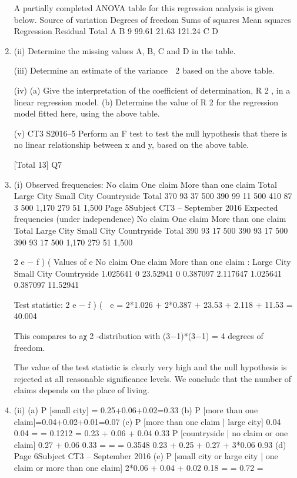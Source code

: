 \documentclass[a4paper,12pt]{article}
\begin{document}
\begin{enumerate}
A partially completed ANOVA table for this regression analysis is given below.
Source of
variation Degrees of
freedom Sums of
squares Mean
squares
Regression
Residual
Total A
B
9 99.61
21.63
121.24 C
D
\item (ii) Determine the missing values A, B, C and D in the table.

(iii) Determine an estimate of the variance  2 based on the above table.

(iv) (a) Give the interpretation of the coefficient of determination, R 2 , in a
linear regression model.
(b) Determine the value of R 2 for the regression model fitted here, using
the above table.

(v)
CT3 S2016–5
Perform an F test to test the null hypothesis that there is no linear relationship
between x and y, based on the above table.

[Total 13]
Q7
\item (i)
Observed frequencies:
No claim
One claim
More than one claim
Total
Large City Small City Countryside Total
370
93
37
500 390
99
11
500 410
87
3
500 1,170
279
51
1,500
Page 5Subject CT3  – September 2016 
Expected frequencies (under independence)
No claim
One claim
More than one claim
Total
Large City Small City Countryside Total
390
93
17
500 390
93
17
500 390
93
17
500 1,170
279
51
1,500

2
e − f )
(
Values of
e
No claim
One claim
More than one claim
:
Large City Small City Countryside
1.025641
0
23.52941 0
0.387097
2.117647 1.025641
0.387097
11.52941

Test statistic:
2
e − f )
(

e
= 2*1.026 + 2*0.387 + 23.53 + 2.118 + 11.53 = 40.004

This compares to aχ 2 -distribution with (3−1)*(3−1) = 4 degrees of freedom.

The value of the test statistic is clearly very high and the null hypothesis is
rejected at all reasonable significance levels. We conclude that the number of
claims depends on the place of living.

\item (ii)
(a) P [small city] = 0.25+0.06+0.02=0.33 
(b) P [more than one claim]=0.04+0.02+0.01=0.07 
(c) P [more than one claim | large city]
0.04
0.04
=
= 0.1212
=
0.23 + 0.06 + 0.04 0.33 
P [countryside | no claim or one claim]
0.27 + 0.06
0.33
=
=
= 0.3548
0.23 + 0.25 + 0.27 + 3*0.06 0.93 
(d)
Page 6Subject CT3  – September 2016 
(e)
P [small city or large city | one claim or more than one claim]
2*0.06 + 0.04 + 0.02
0.18
=
= 0.72
=


\end{enumerate}
\end{document}
